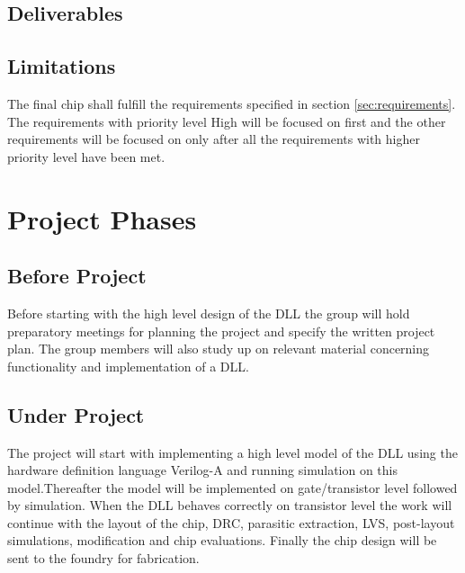 \documentclass[a4paper,12pt]{article} \usepackage{graphicx}
\begin{document}
\subsection{Deliverables}

\begin{LIPSleveranslista}

\hline
\end{LIPSleveranslista}


\subsection{Limitations}
The final chip shall fulfill the requirements specified in section \ref{sec:requirements}.
The requirements with priority level High will be focused on first and the other requirements 
will be focused on only after all the requirements with higher priority level have been met.

\section{Project Phases} 
\subsection{Before Project}
Before starting with the high level design of the DLL the group will hold
preparatory meetings for planning the project and specify the written project
plan. The group members will also study up on relevant material concerning
functionality and implementation of a DLL.
  
\subsection{Under Project}
The project will start with implementing a high level model of the DLL using
the hardware definition language Verilog-A and running simulation on this
model.Thereafter the model will be implemented on gate/transistor level followed
by
simulation. When the DLL behaves correctly on transistor level the work will
continue with the layout of the chip, DRC, parasitic extraction, LVS,
post-layout simulations, modification and chip evaluations. Finally the chip
design will be sent to the foundry for fabrication.
\end{document}
